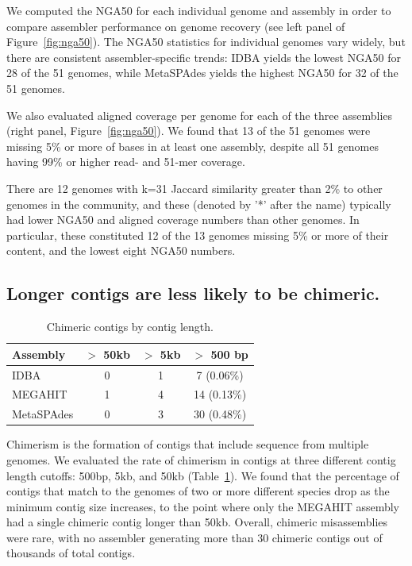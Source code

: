 \documentclass[11pt]{article}
\begin{document}
We computed the NGA50 for each individual genome and assembly in order
to compare assembler performance on genome recovery (see left panel of
Figure~\ref{fig:nga50}).  The NGA50 statistics for individual genomes
vary widely, but there are consistent assembler-specific trends: IDBA
yields the lowest NGA50 for 28 of the 51 genomes, while MetaSPAdes yields
the highest NGA50 for 32 of the 51 genomes.

We also evaluated aligned coverage per genome for each of the three
assemblies (right panel, Figure~\ref{fig:nga50}).  We found that 13
of the 51 genomes were missing 5\% or more of bases in at least one
assembly, despite all 51 genomes having 99\% or higher read- and
51-mer coverage.

There are 12 genomes with k=31 Jaccard similarity greater than 2\% to
other genomes in the community, and these (denoted by '*' after the
name) typically had lower NGA50 and aligned coverage numbers than
other genomes.  In particular, these constituted 12 of the 13 genomes
missing 5\% or more of their content, and the lowest eight NGA50 numbers.

\subsection*{Longer contigs are less likely to be chimeric.}

\begin{table}[!h]
\centering
\caption{Chimeric contigs by contig length.}
\begin{tabular}{|l|c|c|c|}\hline
\textbf{Assembly} & \textbf {$>$ 50kb} & \textbf {$>$ 5kb} & \textbf{$>$ 500 bp}
\\ \hline

IDBA         & 0 & 1 & 7 (0.06\%) \\
MEGAHIT      & 1 & 4 & 14 (0.13\%) \\ 
MetaSPAdes       & 0 & 3 & 30 (0.48\%) \\
\hline

\end{tabular}
\label{table:contig-chimera}

\end{table}


Chimerism is the formation of contigs that include sequence from
multiple genomes.  We evaluated the rate of chimerism in contigs at
three different contig length cutoffs: 500bp, 5kb, and 50kb
(Table~\ref{table:contig-chimera}).  We found that the percentage of
contigs that match to the genomes of two or more different species
drop as the minimum contig size increases, to the point where only the
MEGAHIT assembly had a single chimeric contig longer than 50kb.
Overall, chimeric misassemblies were rare, with no assembler
generating more than 30 chimeric contigs out of thousands of total
contigs.
\end{document}
